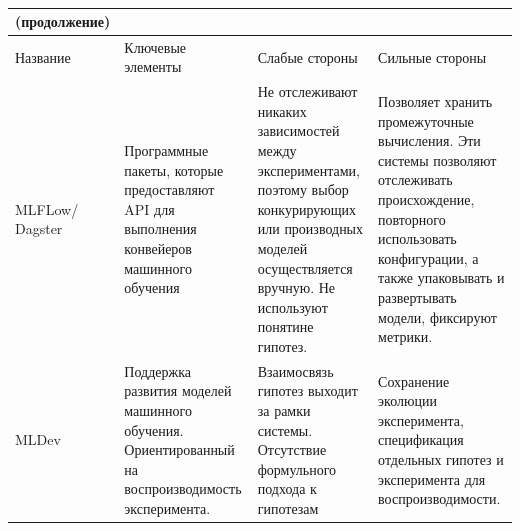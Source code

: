 \begin{table} [ht]%
	\caption*{}%
    \setlength\extrarowheight{0pt} %
    \setlength{\tymin}{2.3cm}%
	\begin{tabulary}{\textwidth}{@{}>{\zz}L >{\zz}L >{\zz}L >{\zz}L@{}}%
        \toprule     %
         \scriptsize (продолжение) & & & 
        \\
        \midrule
    	Название &
    	Ключевые элементы &
    	Слабые стороны &
    	Сильные стороны	\\
        \midrule %

        MLFLow/ Dagster &
        Программные пакеты, которые предоставляют API для выполнения конвейеров машинного обучения 
        &
        Не отслеживают никаких зависимостей между экспериментами, поэтому выбор конкурирующих или производных моделей 
        осуществляется вручную. Не используют понятине гипотез.
        &
        Позволяет хранить промежуточные вычисления. Эти системы позволяют отслеживать происхождение, повторного 
        использовать конфигурации, а также упаковывать и развертывать модели, фиксируют метрики.
        \\
        \midrule
        MLDev &
        Поддержка развития моделей машинного обучения. Ориентированный на воспроизводимость эксперимента. &
        Взаимосвязь гипотез выходит за рамки системы. Отсутствие формульного подхода к гипотезам &
        Сохранение эколюции эксперимента, спецификация отдельных гипотез и эксперимента для воспроизводимости.
        \\
        \bottomrule %
	\end{tabulary}%
\end{table}


